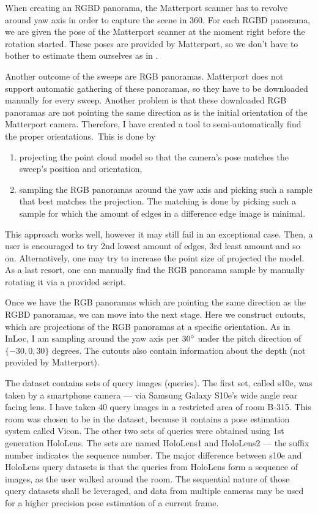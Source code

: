 \documentclass[twoside]{ctuthesis}
\theoremstyle{plain}
\theoremstyle{definition}
\theoremstyle{note}
\begin{document}
When creating an RGBD panorama, the Matterport scanner has to revolve around yaw axis in order to capture the scene in 360\degree. For each RGBD panorama, we are given the pose of the Matterport scanner at the moment right before the rotation started. These poses are provided by Matterport, so we don't have to bother to estimate them ourselves as in \cite{wijmans17rgbd}.

Another outcome of the sweeps are RGB panoramas. Matterport does not support automatic gathering of these panoramas, so they have to be downloaded manually for every sweep. Another problem is that these downloaded RGB panoramas are not pointing the same direction as is the initial orientation of the Matterport camera. Therefore, I have created a tool to semi-automatically find the proper orientations. This is done by

\begin{enumerate}
	\item projecting the point cloud model so that the camera's pose matches the sweep's position and orientation,
	\item sampling the RGB panoramas around the yaw axis and picking such a sample that best matches the projection. The matching is done by picking such a sample for which the amount of edges in a difference edge image is minimal.
\end{enumerate}

This approach works well, however it may still fail in an exceptional case. Then, a user is encouraged to try 2nd lowest amount of edges, 3rd least amount and so on. Alternatively, one may try to increase the point size of projected the model. As a last resort, one can manually find the RGB panorama sample by manually rotating it via a provided script.

Once we have the RGB panoramas which are pointing the same direction as the RGBD panoramas, we can move into the next stage. Here we construct cutouts, which are projections of the RGB panoramas at a specific orientation. As in InLoc, I am sampling around the yaw axis per $30\degree$ under the pitch direction of $\{-30, 0, 30\}$ degrees. The cutouts also contain information about the depth (not provided by Matterport).

The dataset contains sets of query images (queries). The first set, called s10e, was taken by a smartphone camera --- via Samsung Galaxy S10e's wide angle rear facing lens. I have taken 40 query images in a restricted area of room B-315. This room was chosen to be in the dataset, because it contains a pose estimation system called Vicon. The other two sets of queries were obtained using 1st generation HoloLens. The sets are named HoloLens1 and HoloLens2 --- the suffix number indicates the sequence number. The major difference between s10e and HoloLens query datasets is that the queries from HoloLens form a sequence of images, as the user walked around the room. The sequential nature of those query datasets shall be leveraged, and data from multiple cameras may be used for a higher precision pose estimation of a current frame.
\end{document}
